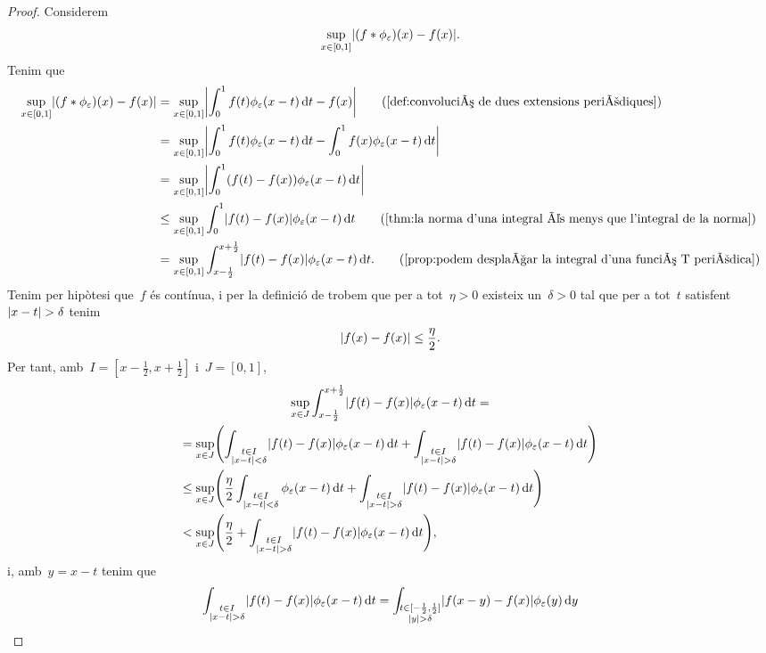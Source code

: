 \documentclass[../../Main.tex]{subfiles}
\begin{document}
\begin{theorem}
\begin{proof}
			Considerem
			\[
			    \sup_{x\in[0,1]}\abs{(f\convolucio\phi_{\varepsilon})(x)-f(x)}.
			\]
			Tenim que
			\begin{align*}
				\sup_{x\in[0,1]}\abs{(f\convolucio\phi_{\varepsilon})(x)-f(x)}&=\sup_{x\in[0,1]}\abs{\int_{0}^{1}f(t)\phi_{\varepsilon}(x-t)\diff t-f(x)} \tag{\ref{def:convolució de dues extensions periòdiques}} \\
				&=\sup_{x\in[0,1]}\abs{\int_{0}^{1}f(t)\phi_{\varepsilon}(x-t)\diff t-\int_{0}^{1}f(x)\phi_{\varepsilon}(x-t)\diff t} \\
				&=\sup_{x\in[0,1]}\abs{\int_{0}^{1}(f(t)-f(x))\phi_{\varepsilon}(x-t)\diff t} \\
				&\leq\sup_{x\in[0,1]}\int_{0}^{1}\abs{f(t)-f(x)}\phi_{\varepsilon}(x-t)\diff t \tag{\ref{thm:la norma d'una integral és menys que l'integral de la norma}} \\
				&=\sup_{x\in[0,1]}\int_{x-\frac{1}{2}}^{x+\frac{1}{2}}\abs{f(t)-f(x)}\phi_{\varepsilon}(x-t)\diff t.
				\tag{\ref{prop:podem desplaçar la integral d'una funció T periòdica}}
			\end{align*}
			 Tenim per hipòtesi que~\(f\) és contínua, i per la definició de  trobem que per a tot~\(\eta>0\) existeix un~\(\delta>0\) tal que per a tot~\(t\) satisfent~\(\abs{x-t}>\delta\) tenim
			 \[
			     \abs{f(x)-f(x)}\leq\frac{\eta}{2}.
			 \]
			 Per tant, amb~\(I=[x-\frac{1}{2},x+\frac{1}{2}]\) i~\(J=[0,1]\), %
			 \begin{multline*}
				 \sup_{x\in J}\int_{x-\frac{1}{2}}^{x+\frac{1}{2}}\abs{f(t)-f(x)}\phi_{\varepsilon}(x-t)\diff t = \\
				 =\sup_{x\in J}\left(\int_{\substack{t\in I\\\abs{x-t}<\delta}}\abs{f(t)-f(x)}\phi_{\varepsilon}(x-t)\diff t+\int_{\substack{t\in I\\\abs{x-t}>\delta}}\abs{f(t)-f(x)}\phi_{\varepsilon}(x-t)\diff t\right) \hfill\\
				 \leq\sup_{x\in J}\left(\frac{\eta}{2}\int_{\substack{t\in I\\\abs{x-t}<\delta}}\phi_{\varepsilon}(x-t)\diff t+\int_{\substack{t\in I\\\abs{x-t}>\delta}}\abs{f(t)-f(x)}\phi_{\varepsilon}(x-t)\diff t\right) \hfill\\
				 <\sup_{x\in J}\left(\frac{\eta}{2}+\int_{\substack{t\in I\\\abs{x-t}>\delta}}\abs{f(t)-f(x)}\phi_{\varepsilon}(x-t)\diff t\right), \hfill
			 \end{multline*}
			 i, amb~\(y=x-t\) tenim que %
			 \[
			     \int_{\substack{t\in I\\\abs{x-t}>\delta}}\abs{f(t)-f(x)}\phi_{\varepsilon}(x-t)\diff t=\int_{\substack{t\in[-\frac{1}{2},\frac{1}{2}]\\\abs{y}>\delta}}\abs{f(x-y)-f(x)}\phi_{\varepsilon}(y)\diff y
			 \]
		\end{proof}
	\end{theorem}
\end{document}
